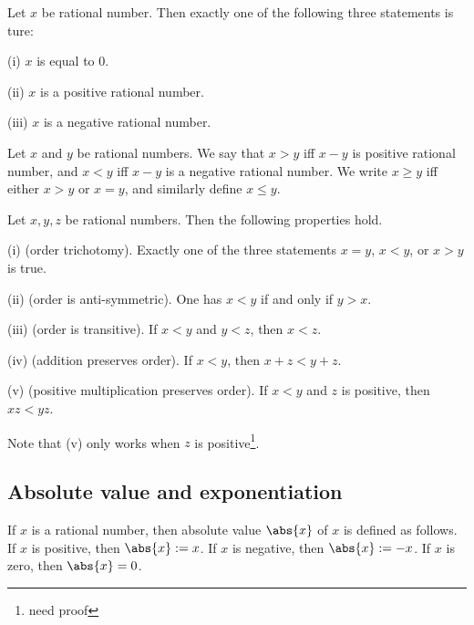 \begin{lemma}
Let $x$ be rational number. Then exactly one of the following three statements is ture:
\ben
\item [(i)] $x$ is equal to 0.
\item [(ii)] $x$ is a positive rational number.
\item [(iii)] $x$ is a negative rational number.
\een
\end{lemma}

\begin{definition}
Let $x$ and $y$ be rational numbers. We say that $x>y$ iff $x-y$ is positive rational number, and $x<y$ iff $x-y$ is a negative rational number. We write $x\geq y$ iff either $x>y$ or $x=y$, and similarly define $x\leq y$.
\end{definition}

\begin{proposition}
Let $x,y,z$ be rational numbers. Then the following properties hold.
\ben
\item [(i)] (order trichotomy). Exactly one of the three statements $x=y$, $x<y$, or $x>y$ is true.
\item [(ii)] (order is anti-symmetric). One has $x<y$ if and only if $y>x$.
\item [(iii)] (order is transitive). If $x<y$ and $y<z$, then $x<z$.
\item [(iv)] (addition preserves order). If $x<y$, then $x+z < y+z$.
\item [(v)] (positive multiplication preserves order). If $x<y$ and $z$ is positive, then $xz < yz$.
\een
\end{proposition}

\begin{remark}%
Note that (v) only works when $z$ is positive\footnote{need proof}.
\end{remark}


\subsection{Absolute value and exponentiation}

\begin{definition}
If $x$ is a rational number, then absolute value $\abs{x}$ of $x$ is defined as follows. If $x$ is positive, then $\abs{x} := x$. If $x$ is negative, then $\abs{x}:=-x$. If $x$ is zero, then $\abs{x} = 0$.
\end{definition}

